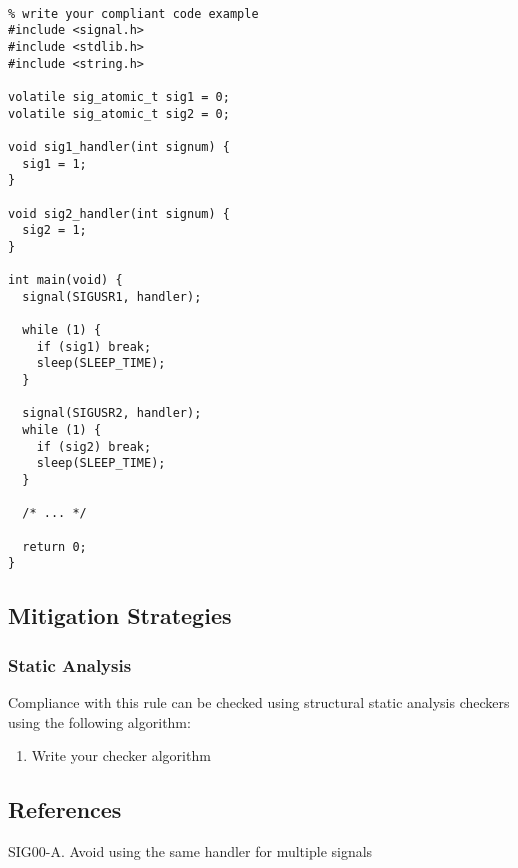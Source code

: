 \begin{verbatim}

% write your compliant code example
#include <signal.h>
#include <stdlib.h>
#include <string.h>

volatile sig_atomic_t sig1 = 0;
volatile sig_atomic_t sig2 = 0;

void sig1_handler(int signum) {
  sig1 = 1;
}

void sig2_handler(int signum) {
  sig2 = 1;
}

int main(void) {
  signal(SIGUSR1, handler);

  while (1) {
    if (sig1) break;
    sleep(SLEEP_TIME);
  }

  signal(SIGUSR2, handler);
  while (1) {
    if (sig2) break;
    sleep(SLEEP_TIME);
  }

  /* ... */

  return 0;
}

\end{verbatim}

\subsection{Mitigation Strategies}
\subsubsection{Static Analysis} 

Compliance with this rule can be checked using structural static analysis checkers using the following algorithm:

\begin{enumerate}
\item Write your checker algorithm
\end{enumerate}

\subsection{References}


 SIG00-A. Avoid using the same handler for multiple signals

